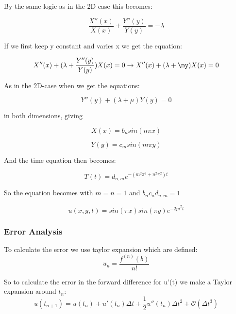 \documentclass[a4paper,10pt]{article}
\begin{document}
By the same logic as in the 2D-case this becomes:

\begin{equation}
 \frac{X''(x)}{X(x)} + \frac{Y''(y)}{Y(y)} = -\lambda
\end{equation}

If we first keep y constant and varies x we get the equation:

\begin{equation}
 X''(x) + (\lambda + \frac{Y''(y)}{Y(y)})X(x) = 0 \rightarrow X''(x) + (\lambda + \my)X(x) = 0
\end{equation}

As in the 2D-case when we get the equations:

\begin{equation}
 Y''(y) + (\lambda + \mu)Y(y) = 0
\end{equation}

in both dimensions, giving

\begin{equation}
 X(x) = b_nsin(n\pi x)
\end{equation}

\begin{equation}
 Y(y) = c_msin(m\pi y)
\end{equation}

And the time equation then becomes:

\begin{equation}
 T(t) = d_{n,m}e^{-(m^2\pi^2 + n^2\pi^2)t}
\end{equation}

So the equation becomes with $m=n=1$ and $b_nc_nd_{n,m} = 1$

\begin{equation}
 u(x,y,t) = sin(\pi x)sin(\pi y) e^{-2pi^2t}
\end{equation}

\subsubsection{Error Analysis}
To calculate the error we use taylor expansion which are defined:
\begin{equation}
 u_n = \frac{f^{(n)}(b)}{n!}
\end{equation}

So to calculate the error in the forward difference for u'(t) we make a Taylor expansion around $t_n$:
\begin{equation}
 u(t_{n+1}) = u(t_n) + u'(t_n)\Delta t + \frac{1}{2}u''(t_n)\Delta t^2 + \mathcal{O}(\Delta t^3)
\end{equation}
\end{document}
